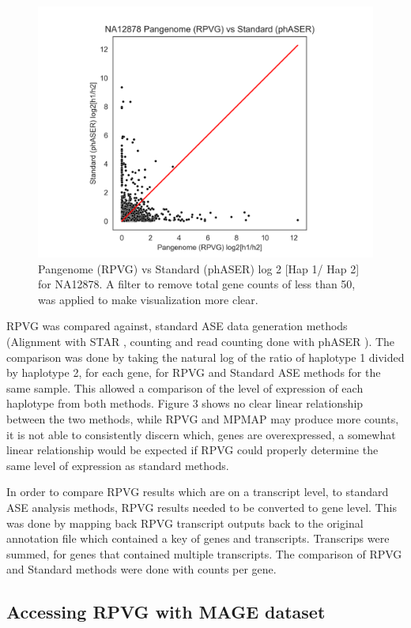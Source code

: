 \documentclass{article}
\begin{document}
\begin{figure}[H]
  \centering
  \includegraphics[width=0.8\linewidth]{NA12878_Pangenome_vs_Standard_log_Filter_50.png}
  \caption{Pangenome (RPVG) vs Standard (phASER) log 2 [Hap 1/ Hap 2] for NA12878. A filter to remove total gene counts of less than 50, was applied to make visualization more clear.
  } 
\end{figure}  

RPVG was compared against, standard ASE data generation methods 
(Alignment with STAR \citep{Dobin_2012}, counting and read counting done with phASER \citep{Castel_2016}). The comparison
was done by taking the natural log of the ratio of haplotype 1 divided by haplotype 2, for each gene, for RPVG
and Standard ASE methods for the same sample. This allowed a comparison of the level of expression of 
each haplotype from both methods. Figure 3 shows no clear linear relationship between the two methods,
while RPVG and MPMAP may produce more counts, it is not able to consistently discern which, genes are 
overexpressed, a somewhat linear relationship would be expected if RPVG could properly determine the same
level of expression as standard methods.

In order to compare RPVG results which are on a transcript level, to standard ASE analysis methods, RPVG results needed to be 
converted to gene level. This was done by mapping back RPVG transcript outputs back to the original 
annotation file which contained a key of genes and transcripts. 
Transcrips were summed, for genes that contained multiple transcripts. The comparison of 
RPVG and Standard methods were done with counts per gene.

\subsection{Accessing RPVG with MAGE dataset}
\end{document}
